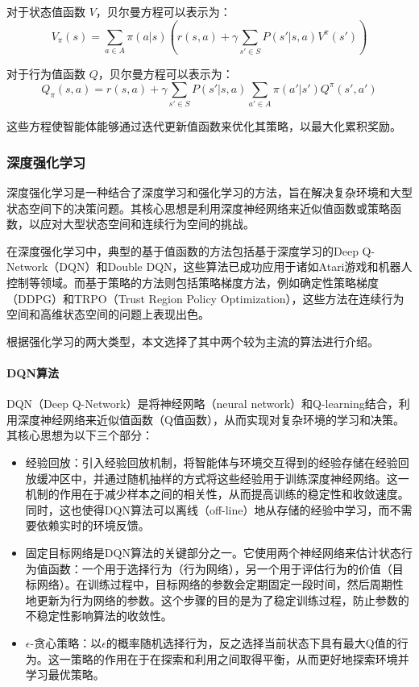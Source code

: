 对于状态值函数 $V$，贝尔曼方程可以表示为：
\begin{equation}
    V_\pi(s) = \sum_{a \in A} \pi(a|s) ( r(s,a) + \gamma \sum_{s' \in S} P(s'|s,a) V^\pi(s') )
\end{equation}

对于行为值函数 $Q$，贝尔曼方程可以表示为：
\begin{equation}
    Q_\pi(s,a) = r(s,a) + \gamma \sum_{s' \in S} P(s'|s,a) \sum_{a' \in A} \pi(a'|s') Q^\pi(s',a')
\end{equation}

这些方程使智能体能够通过迭代更新值函数来优化其策略，以最大化累积奖励。

\subsubsection{深度强化学习}
深度强化学习是一种结合了深度学习和强化学习的方法\cite{mnih2013playing}，旨在解决复杂环境和大型状态空间下的决策问题。\cite{1023788635.nh}其核心思想是利用深度神经网络来近似值函数或策略函数，以应对大型状态空间和连续行为空间的挑战。

在深度强化学习中，典型的基于值函数的方法包括基于深度学习的Deep Q-Network（DQN）和Double DQN，这些算法已成功应用于诸如Atari游戏和机器人控制等领域。而基于策略的方法则包括策略梯度方法，例如确定性策略梯度（DDPG）和TRPO（Trust Region Policy Optimization），这些方法在连续行为空间和高维状态空间的问题上表现出色。

根据强化学习的两大类型，本文选择了其中两个较为主流的算法进行介绍。
\paragraph{DQN算法}
DQN（Deep Q-Network）是将神经网略（neural network）和Q-learning结合，利用深度神经网络来近似值函数（Q值函数）\cite{mnih2013playing}，从而实现对复杂环境的学习和决策。其核心思想为以下三个部分：
\begin{itemize}
    \item 经验回放：引入经验回放机制，将智能体与环境交互得到的经验存储在经验回放缓冲区中，并通过随机抽样的方式将这些经验用于训练深度神经网络。这一机制的作用在于减少样本之间的相关性，从而提高训练的稳定性和收敛速度。同时，这也使得DQN算法可以离线（off-line）地从存储的经验中学习，而不需要依赖实时的环境反馈。
    \item 固定目标网络是DQN算法的关键部分之一。它使用两个神经网络来估计状态行为值函数：一个用于选择行为（行为网络），另一个用于评估行为的价值（目标网络）。在训练过程中，目标网络的参数会定期固定一段时间，然后周期性地更新为行为网络的参数。这个步骤的目的是为了稳定训练过程，防止参数的不稳定性影响算法的收敛性。
    \item $\epsilon$-贪心策略：以$\epsilon$的概率随机选择行为，反之选择当前状态下具有最大Q值的行为。这一策略的作用在于在探索和利用之间取得平衡，从而更好地探索环境并学习最优策略。
\end{itemize}

